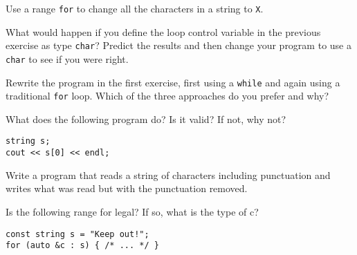 %
%
\begin{question}
Use a range \verb|for| to change all the characters in a string to \verb|X|.
\end{question}

\begin{question}
What would happen if you define the loop control variable in
the previous exercise as type \verb|char|? Predict the results and then change your
program to use a \verb|char| to see if you were right.
\end{question}

\begin{question}
Rewrite the program in the first exercise, first using a \verb|while|
and again using a traditional \verb|for| loop. Which of the three approaches do
you prefer and why?
\end{question}

\begin{question}
What does the following program do? Is it valid? If not, why not?
\begin{lstlisting}
string s;
cout << s[0] << endl;
\end{lstlisting}
\end{question}

\begin{question}
Write a program that reads a string of characters including
punctuation and writes what was read but with the punctuation removed.
\end{question}

\begin{question}
Is the following range for legal? If so, what is the type of c?
\begin{lstlisting}
const string s = "Keep out!";
for (auto &c : s) { /* ... */ }
\end{lstlisting}
\end{question}
